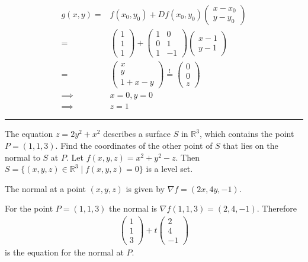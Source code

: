 \documentclass[a4paper,fontsize = 10pt]{article}
\def\R{\mathbb{R}}
\begin{document}
\begin{align*}
g(x, y) = & f(x_0, y_0) + Df(x_0, y_0) \begin{pmatrix} x - x_0 \\ y - y_0 \end{pmatrix}\\
= & \begin{pmatrix} 1 \\ 1 \\ 1 \end{pmatrix} + \begin{pmatrix} 1 & 0 \\ 0 & 1 \\ 1 & -1 \end{pmatrix} \begin{pmatrix} x - 1 \\ y - 1 \end{pmatrix}\\
= & \begin{pmatrix} x \\ y \\ 1 + x - y \end{pmatrix} \overset{!}{=} \begin{pmatrix} 0 \\ 0 \\ z \end{pmatrix}\\
\implies & x = 0, y = 0\\
\implies & z = 1
\end{align*}

\vspace{0.1cm}
\hrule
\vspace{0.2cm}

The equation $z = 2y^2 + x^2$ describes a surface $S$ in $\R^3$, which contains the point $P =(1,1,3)$. Find the coordinates of the other point of $S$ that lies on the normal to $S$ at $P$.
\vspace{0.2cm}
Let $f(x,y,z) = x^2 + y^2 - z$. Then $S = \{(x,y,z) \in \R^3 \mid f(x,y,z) = 0\}$ is a level set.

The normal at a point $(x,y,z)$ is given by $\nabla f = (2x, 4y, -1)$.

For the point $P = (1,1,3)$ the normal is $\nabla f (1,1,3) = (2,4,-1)$.
Therefore 
\begin{align*}
  \begin{pmatrix} 1\\ 1\\ 3 \end{pmatrix} + t \begin{pmatrix}2 \\ 4\\ -1 \end{pmatrix} 
\end{align*}
is the equation for the normal at $P$.
\end{document}
